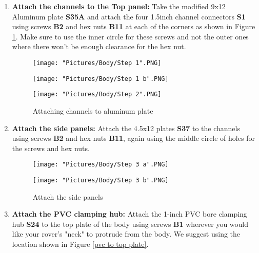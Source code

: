 \documentclass[12pt]{article}
\begin{document}
\begin{enumerate}
\item \textbf{Attach the channels to the Top panel: } Take the modified 9x12 Aluminum plate \textbf{S35A} and attach the four 1.5inch channel connectors \textbf{S1} using screws \textbf{B2} and hex nuts \textbf {B11} at each of the corners as shown in Figure \ref{channel to al plate}. Make sure to use the inner circle for these screws and not the outer ones where there won't be enough clearance for the hex nut.

\begin{figure}[H]
  	\centering
  	\begin{minipage}[b]{0.20\textwidth}
    		\texttt{[image: "Pictures/Body/Step 1".PNG]}
  	\end{minipage}
  	\hfill
  	\begin{minipage}[b]{0.30\textwidth}
    		\texttt{[image: "Pictures/Body/Step 1 b".PNG]}
  	\end{minipage}
    	\hfill
  	\begin{minipage}[b]{0.40\textwidth}
    		\texttt{[image: "Pictures/Body/Step 2".PNG]}
  	\end{minipage}
  	\caption{Attaching channels to aluminum plate}
	\label{channel to al plate}
\end{figure}

\item \textbf{Attach the side panels: } Attach the 4.5x12 plates \textbf{S37} to the channels using screws \textbf{B2} and hex nuts \textbf{B11}, again using the middle circle of holes for the screws and hex nuts.

\begin{figure}[H]
 	\centering
 	\begin{minipage}[b]{0.45\textwidth}
    		\texttt{[image: "Pictures/Body/Step 3 a".PNG]}
  	\end{minipage}
  	\hfill
  	\begin{minipage}[b]{0.45\textwidth}
    		\texttt{[image: "Pictures/Body/Step 3 b".PNG]}
  	\end{minipage}
  	\caption{Attach the side panels}
	\label{Body side panels}
\end{figure}

\item \textbf{Attach the PVC clamping hub:} Attach the 1-inch PVC bore clamping hub \textbf{S24} to the top plate of the body using screws \textbf{B1} wherever you would like your rover's "neck" to protrude from the body. We suggest using the location shown in Figure \ref{pvc to top plate}.


\end{enumerate}
\end{document}
